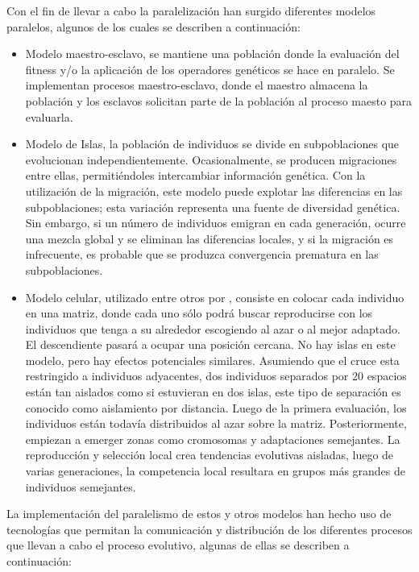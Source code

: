 Con el fin de llevar a cabo la paralelizaci\'on han surgido diferentes modelos paralelos, algunos de los cuales se describen a continuación:

\begin{itemize}
	\item Modelo maestro-esclavo, se mantiene una población donde la evaluación del fitness y/o la aplicación de los operadores genéticos se hace en paralelo. Se implementan procesos maestro-esclavo, donde el maestro almacena la población y los esclavos solicitan parte de la población al proceso maesto para evaluarla.
	\item Modelo de Islas, la población de individuos se divide en subpoblaciones que evolucionan independientemente. Ocasionalmente, se producen migraciones entre ellas, permitiéndoles intercambiar información genética. Con la utilización de la migración, este modelo puede explotar las diferencias en las subpoblaciones; esta variación representa una fuente de diversidad genética. Sin embargo, si un número de individuos emigran en cada generación, ocurre una mezcla global y se eliminan las diferencias locales, y si la migración es infrecuente, es probable que se produzca convergencia prematura en las subpoblaciones.
	\item Modelo celular, utilizado entre otros por \cite{DBLP:journals/tec/FolinoPS03}, consiste en colocar cada individuo en una matriz, donde cada uno sólo podrá buscar reproducirse con los individuos que tenga a su alrededor escogiendo al azar o al mejor adaptado. El descendiente pasar\'a a ocupar una posición cercana. No hay islas en este modelo, pero hay efectos potenciales similares. Asumiendo que el cruce esta restringido a individuos adyacentes, dos individuos separados por 20 espacios están tan aislados como si estuvieran en dos islas, este tipo de separación es conocido como aislamiento por distancia. Luego de la primera evaluación, los individuos están todavía distribuidos al azar sobre la matriz. Posteriormente, empiezan a emerger zonas como cromosomas y adaptaciones semejantes. La reproducción y selección local crea tendencias evolutivas aisladas, luego de varias generaciones, la competencia local resultara en grupos m\'as grandes de individuos semejantes.
\end{itemize}

La implementación del paralelismo de estos y otros modelos han hecho uso de tecnologías que permitan la comunicación y distribución de los diferentes procesos que llevan a cabo el proceso evolutivo, algunas de ellas se describen a continuación:

